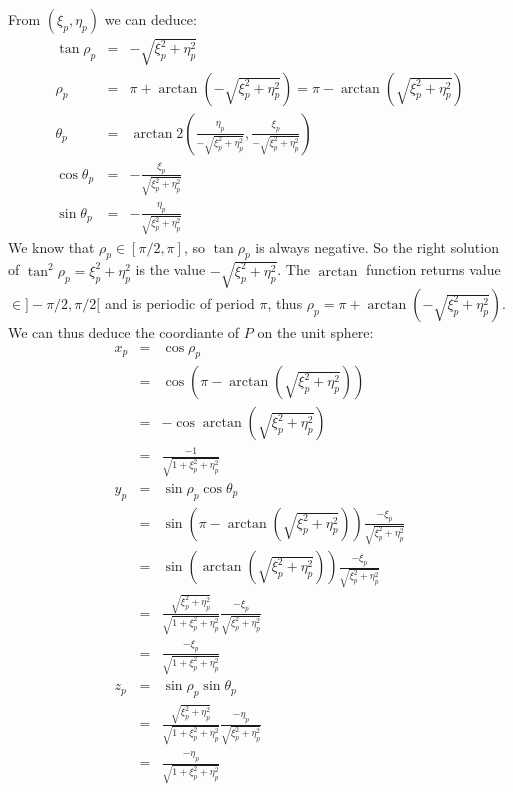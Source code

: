     From $(\xi_p, \eta_p)$ we can deduce:
    \begin{eqnarray}
      \tan\rho_p & = & -\sqrt{\xi_p^2 + \eta_p^2} \\
      \rho_p & = & \pi + \arctan(-\sqrt{\xi_p^2 + \eta_p^2}) = \pi - \arctan(\sqrt{\xi_p^2 + \eta_p^2}) \\
      \theta_p & = & \arctan2(\frac{\eta_p}{-\sqrt{\xi_p^2 + \eta_p^2}}, \frac{\xi_p}{-\sqrt{\xi_p^2 + \eta_p^2}}) \\
      \cos\theta_p & = & -\frac{\xi_p}{\sqrt{\xi_p^2 + \eta_p^2}} \\
      \sin\theta_p & = & -\frac{\eta_p}{\sqrt{\xi_p^2 + \eta_p^2}}
    \end{eqnarray}
    We know that $\rho_p \in [\pi/2, \pi]$, so $\tan\rho_p$ is always negative.
    So the right solution of $\tan^2\rho_p = \xi_p^2 + \eta_p^2$ is the value $-\sqrt{\xi_p^2 + \eta_p^2}$.
    The $\arctan$ function returns value $\in ]-\pi/2, \pi/2[$ and is periodic of period $\pi$, 
    thus $\rho_p =  \pi + \arctan(-\sqrt{\xi_p^2 + \eta_p^2})$.
    We can thus deduce the coordiante of $P$ on the unit sphere:
    \begin{eqnarray}
      x_p & = & \cos\rho_p \\ 
          & = & \cos(\pi - \arctan(\sqrt{\xi_p^2 + \eta_p^2})) \\ %
	  & = & -\cos \arctan(\sqrt{\xi_p^2 + \eta_p^2}) \\
	  & = & \frac{-1}{\sqrt{1 + \xi_p^2 + \eta_p^2}} \\
      y_p & = & \sin\rho_p \cos\theta_p \\ %
          & = & \sin(\pi - \arctan(\sqrt{\xi_p^2 + \eta_p^2})) \frac{-\xi_p}{\sqrt{\xi_p^2 + \eta_p^2}} \\
	  & = & \sin(\arctan(\sqrt{\xi_p^2 + \eta_p^2})) \frac{-\xi_p}{\sqrt{\xi_p^2 + \eta_p^2}} \\
	  & = & \frac{\sqrt{\xi_p^2 + \eta_p^2}}{\sqrt{1 + \xi_p^2 + \eta_p^2}} \frac{-\xi_p}{\sqrt{\xi_p^2 + \eta_p^2}} \\
	  & = & \frac{-\xi_p}{\sqrt{1 + \xi_p^2 + \eta_p^2}} \\
      z_p & = & \sin\rho_p \sin\theta_p \\ %
          & = & \frac{\sqrt{\xi_p^2 + \eta_p^2}}{\sqrt{1 + \xi_p^2 + \eta_p^2}} \frac{-\eta_p}{\sqrt{\xi_p^2 + \eta_p^2}} \\
	  & = & \frac{-\eta_p}{\sqrt{1 + \xi_p^2 + \eta_p^2}}
    \end{eqnarray}
